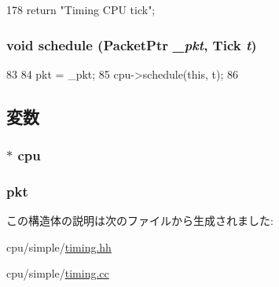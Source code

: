 \begin{DoxyCode}
178 { return "Timing CPU tick"; }
\end{DoxyCode}
\hypertarget{structTimingSimpleCPU_1_1TimingCPUPort_1_1TickEvent_abe6619704168cff2b6e6c1c4d91de7bd}{
\subsubsection[{schedule}]{\setlength{\rightskip}{0pt plus 5cm}void schedule ({\bf PacketPtr} {\em \_\-pkt}, \/  {\bf Tick} {\em t})}}
\label{structTimingSimpleCPU_1_1TimingCPUPort_1_1TickEvent_abe6619704168cff2b6e6c1c4d91de7bd}



\begin{DoxyCode}
83 {
84     pkt = _pkt;
85     cpu->schedule(this, t);
86 }
\end{DoxyCode}


\subsection{変数}
\hypertarget{structTimingSimpleCPU_1_1TimingCPUPort_1_1TickEvent_ace3e131319475077fac2fa861708b0c9}{
\subsubsection[{cpu}]{$\ast$ {\bf cpu}}}
\label{structTimingSimpleCPU_1_1TimingCPUPort_1_1TickEvent_ace3e131319475077fac2fa861708b0c9}
\hypertarget{structTimingSimpleCPU_1_1TimingCPUPort_1_1TickEvent_a3a891bc2a0fcbe6be5297077d94e2df7}{
\subsubsection[{pkt}]{ {\bf pkt}}}
\label{structTimingSimpleCPU_1_1TimingCPUPort_1_1TickEvent_a3a891bc2a0fcbe6be5297077d94e2df7}


この構造体の説明は次のファイルから生成されました:\begin{DoxyCompactItemize}
\item 
cpu/simple/\hyperlink{timing_8hh}{timing.hh}\item 
cpu/simple/\hyperlink{timing_8cc}{timing.cc}\end{DoxyCompactItemize}
